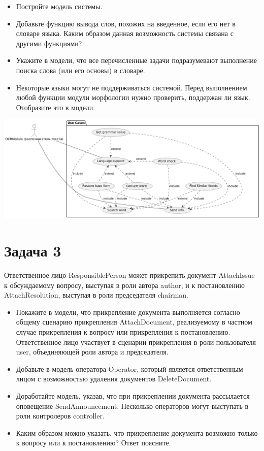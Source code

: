 \documentclass{article}
\begin{document}
\begin{itemize}
    \item Постройте модель системы.
    \item Добавьте функцию вывода слов, похожих на введенное, если его нет в словаре языка. Каким образом данная возможность системы связана с другими функциями?
    \item Укажите в модели, что все перечисленные задачи подразумевают выполнение поиска слова (или его основы) в словаре.
    \item Некоторые языки могут не поддерживаться системой. Перед выполнением любой функции модули морфологии нужно проверить, поддержан ли язык. Отобразите это в модели.
\end{itemize}

\includegraphics[width=\textwidth]{2.png}

\section{Задача 3}
Ответственное лицо ResponsiblePerson может прикрепить документ AttachIssue к обсуждаемому вопросу, выступая в роли автора author, и к постановлению AttachResolution, выступая в роли председателя chairman.

\begin{itemize}
    \item Покажите в модели, что прикрепление документа выполняется согласно общему сценарию прикрепления AttachDocument, реализуемому в частном случае прикрепления к вопросу или прикрепления к постановлению. Ответственное лицо участвует в сценарии прикрепления в роли пользователя user, объединяющей роли автора и председателя.
    \item Добавьте в модель оператора Operator, который является ответственным лицом с возможностью удаления документов DeleteDocument.
    \item Доработайте модель, указав, что при прикреплении документа рассылается оповещение SendAnnouncement. Несколько операторов могут выступать в роли контролеров controller.
    \item Каким образом можно указать, что прикрепление документа возможно только к вопросу или к постановлению? Ответ поясните.
\end{itemize}
\end{document}
